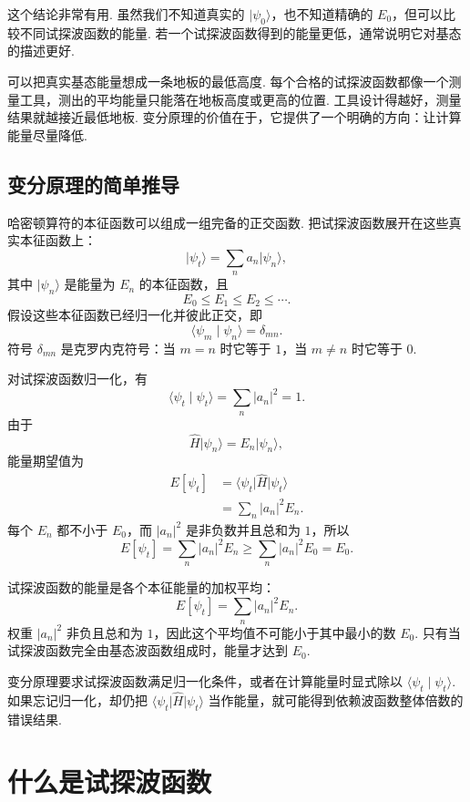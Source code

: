 \documentclass[UTF8,11pt,a4paper,openany]{ctexbook}
\newcommand{\ket}[1]{\lvert #1\rangle}\newcommand{\bra}[1]{\langle #1\rvert}
\newcommand{\braket}[2]{\langle #1\mid #2\rangle}\newcommand{\ii}{\mathrm i}
\begin{document}
这个结论非常有用. 虽然我们不知道真实的 $\ket{\psi_0}$，也不知道精确的 $E_0$，但可以比较不同试探波函数的能量. 若一个试探波函数得到的能量更低，通常说明它对基态的描述更好. 

\begin{analogybox}
可以把真实基态能量想成一条地板的最低高度. 每个合格的试探波函数都像一个测量工具，测出的平均能量只能落在地板高度或更高的位置. 工具设计得越好，测量结果就越接近最低地板. 变分原理的价值在于，它提供了一个明确的方向：让计算能量尽量降低. 
\end{analogybox}

\subsection{变分原理的简单推导}

哈密顿算符的本征函数可以组成一组完备的正交函数. 把试探波函数展开在这些真实本征函数上：
\[
\ket{\psi_t}=\sum_n a_n\ket{\psi_n},
\]
其中 $\ket{\psi_n}$ 是能量为 $E_n$ 的本征函数，且
\[
E_0\leq E_1\leq E_2\leq\cdots.
\]
假设这些本征函数已经归一化并彼此正交，即
\[
\braket{\psi_m}{\psi_n}=\delta_{mn}.
\]
符号 $\delta_{mn}$ 是克罗内克符号：当 $m=n$ 时它等于 $1$，当 $m\ne n$ 时它等于 $0$. 

对试探波函数归一化，有
\[
\braket{\psi_t}{\psi_t}
=\sum_n |a_n|^2=1.
\]
由于
\[
\hat H\ket{\psi_n}=E_n\ket{\psi_n},
\]
能量期望值为
\[
\begin{aligned}
E[\psi_t]
&=\bra{\psi_t}\hat H\ket{\psi_t}\\
&=\sum_n |a_n|^2E_n.
\end{aligned}
\]
每个 $E_n$ 都不小于 $E_0$，而 $|a_n|^2$ 是非负数并且总和为 $1$，所以
\[
E[\psi_t]
=\sum_n |a_n|^2E_n
\geq \sum_n |a_n|^2E_0
=E_0.
\]

\begin{derivationbox}
试探波函数的能量是各个本征能量的加权平均：
\[
E[\psi_t]=\sum_n |a_n|^2E_n.
\]
权重 $|a_n|^2$ 非负且总和为 $1$，因此这个平均值不可能小于其中最小的数 $E_0$. 只有当试探波函数完全由基态波函数组成时，能量才达到 $E_0$. 
\end{derivationbox}

\begin{limitbox}
变分原理要求试探波函数满足归一化条件，或者在计算能量时显式除以 $\braket{\psi_t}{\psi_t}$. 如果忘记归一化，却仍把 $\bra{\psi_t}\hat H\ket{\psi_t}$ 当作能量，就可能得到依赖波函数整体倍数的错误结果. 
\end{limitbox}

\section{什么是试探波函数}
\end{document}
